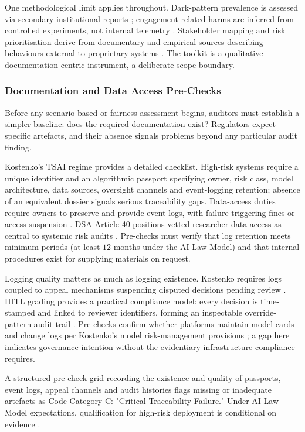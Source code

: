 \documentclass[11pt]{article}
\begin{document}
One methodological limit applies throughout. Dark-pattern prevalence is assessed via secondary institutional reports \parencites[7]{6295677}; engagement-related harms are inferred from controlled experiments, not internal telemetry \parencites[2]{3303310}. Stakeholder mapping and risk prioritisation derive from documentary and empirical sources describing behaviours external to proprietary systems \parencites[10]{2977039}[21]{3195574}[9]{7461574}. The toolkit is a qualitative documentation-centric instrument, a deliberate scope boundary.

\subsubsection{Documentation and Data Access Pre-Checks}
\label{sec:doc_data_prechecks} Before any scenario-based or fairness assessment begins, auditors must establish a simpler baseline: does the required documentation exist? Regulators expect specific artefacts, and their absence signals problems beyond any particular audit finding.

Kostenko's TSAI regime provides a detailed checklist. High-risk systems require a unique identifier and an algorithmic passport specifying owner, risk class, model architecture, data sources, oversight channels and event-logging retention; absence of an equivalent dossier signals serious traceability gaps. Data-access duties require owners to preserve and provide event logs, with failure triggering fines or access suspension \parencites[244]{2977039}. DSA Article 40 positions vetted researcher data access as central to systemic risk audits \parencites[32]{3195574}. Pre-checks must verify that log retention meets minimum periods (at least $12$ months under the AI Law Model) and that internal procedures exist for supplying materials on request.

Logging quality matters as much as logging existence. Kostenko requires logs coupled to appeal mechanisms suspending disputed decisions pending review \parencites[191]{2977039}. HITL grading provides a practical compliance model: every decision is time-stamped and linked to reviewer identifiers, forming an inspectable override-pattern audit trail \parencites[16]{6805789}[17]{6805789}. Pre-checks confirm whether platforms maintain model cards and change logs per Kostenko's model risk-management provisions \parencites[191]{2977039}; a gap here indicates governance intention without the evidentiary infrastructure compliance requires.

A structured pre-check grid recording the existence and quality of passports, event logs, appeal channels and audit histories \parencites[244]{2977039}[15]{5442231}[59]{2702055} flags missing or inadequate artefacts as Code Category C: "Critical Traceability Failure." Under AI Law Model expectations, qualification for high-risk deployment is conditional on evidence \parencites[244]{2977039}.
\end{document}
